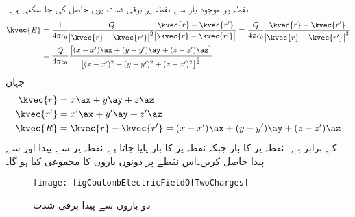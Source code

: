 نقطہ  پر موجود بار  سے نقطہ  پر برقی شدت  یوں حاصل کی جا سکتی ہے۔
\begin{gather}
\begin{aligned} \label{مساوات_کولمب_نقطہ_بار_سے_میدان_کا_حصول}
\kvec{E}&=\frac{1}{4 \pi \epsilon_0 }\frac{Q}{\abs{\kvec{r}-\kvec{r'}}^2} \frac{\kvec{r}-\kvec{r'}}{\abs{\kvec{r}-\kvec{r'}}}=\frac{Q}{4 \pi \epsilon_0 }\frac{\kvec{r}-\kvec{r'}}{\abs{\kvec{r}-\kvec{r'}}^3}\\
&=\frac{Q}{4 \pi \epsilon_0}\frac{\left[(x-x')\ax+(y-y')\ay+(z-z')\az\right]}{\left [(x-x')^2+(y-y')^2+(z-z')^2\right]^{\frac{3}{2}}}
\end{aligned}
\end{gather} 
جہاں
\begin{align*}
\kvec{r}&=x \ax+y \ay+z\az\\
\kvec{r'}&=x' \ax+y' \ay+z'\az\\
\kvec{R}&=\kvec{r}-\kvec{r'}=(x-x') \ax+(y-y') \ay+(z-z')\az
\end{align*}
کے برابر ہے۔
نقطہ  پر  کا بار  جبکہ نقطہ  پر  کا بار  پایا جاتا ہے۔نقطہ  پر   سے پیدا   اور  سے پیدا  حاصل کریں۔اس نقطے پر دونوں باروں کا مجموعی  کیا ہو گا۔
\begin{figure}
\centering
\texttt{[image: figCoulombElectricFieldOfTwoCharges]}
\caption{دو باروں سے پیدا برقی شدت}
\label{شکل_کولمب_دو_باروں_سے_پیدا_برقی_شدت}
\end{figure}

